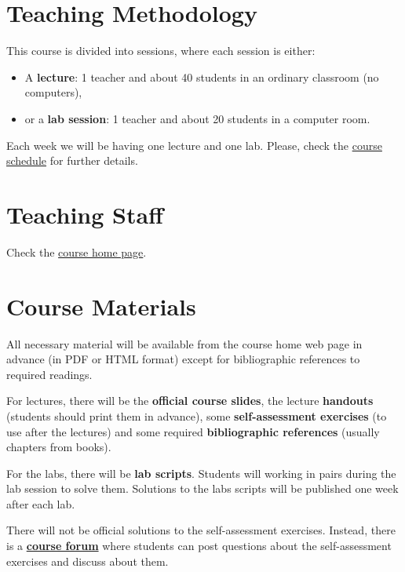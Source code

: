 \documentclass[11pt, a4paper, twoside]{article}
\begin{document}
\section{Teaching Methodology}

This course is divided into sessions, where each session is either:

\begin{itemize}

  \item A \textbf{lecture}: 1 teacher and about 40 students in an ordinary
    classroom (no computers),

  \item or a \textbf{lab session}: 1 teacher and about 20 students in a
    computer room.

\end{itemize}

Each week we will be having one lecture and one lab. Please, check the
\href{http://www.it.uc3m.es/alcortes/asig/1415/ps-ging/schedule.pdf}{course
schedule} for further details.

\section{Teaching Staff}

Check the
\href{http://it.uc3m.es/alcortes/asig/1415/ps-ging/index.html}{course home
page}.

\section{Course Materials}

All necessary material will be available from the course home web page in
advance (in PDF or HTML format) except for bibliographic references to required
readings.

For lectures, there will be the \textbf{official course slides}, the lecture
\textbf{handouts} (students should print them in advance), some
\textbf{self-assessment exercises} (to use after the lectures) and some
required \textbf{bibliographic references} (usually chapters from books).

For the labs, there will be \textbf{lab scripts}. Students will working in
pairs during the lab session to solve them. Solutions to the labs scripts will
be published one week after each lab.

There will not be official solutions to the self-assessment exercises. Instead,
there is a \textbf{\href{http://it.uc3m.es}{course forum}} where students can
post questions about the self-assessment exercises and discuss about them.
\end{document}
